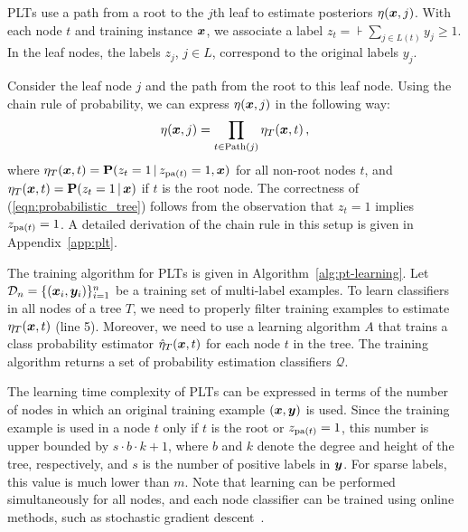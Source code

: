 \documentclass{article}
\newcommand{\cD}{\mathcal{D}}
\newcommand{\prob}{\mathbf{P}}
\newcommand{\Algo}[1]{\textsc{#1}}
\begin{document}
\Algo{PLT}s use a path from a root to the $j$\/th leaf to estimate posteriors $\eta(\boldsymbol{x}, j)$. %
With each node $t$ and training instance $\boldsymbol{x}$, we associate a label $z_t = \assert{\textstyle \sum_{j \in L(t)} y_j \ge 1}$.
In the leaf nodes, the labels $z_j$, $j \in L$, correspond to the original labels $y_j$.

Consider the leaf node $j$ and the path from the root to this leaf node. Using the chain rule of probability, we can express $\eta(\boldsymbol{x}, j)$ in the following way:
\begin{equation}
\eta(\boldsymbol{x}, j) = \prod_{t \in \mathrm{Path}(j)} \eta_T(\boldsymbol{x}, t)\,,
\label{eqn:probabilistic_tree}
\end{equation}
where $\eta_T(\bx, t) = \prob(z_t = 1 \given z_{\pa{t}} =1, \bx)$ for all non-root nodes $t$, and $\eta_T(\bx, t) = \prob(z_t = 1 \given \bx)$ if $t$ is the root node. 
The correctness of (\ref{eqn:probabilistic_tree}) follows from the observation that $z_{t} = 1$ implies $z_{\mathrm{pa}(t)} = 1$. A detailed derivation of the chain rule in this setup is given in Appendix~\ref{app:plt}.


The training algorithm for \Algo{PLT}s is given in Algorithm~\ref{alg:pt-learning}.
Let $\cD_n = \{ (\bx_i, \by_{i}) \}_{i=1}^n$ be a training set of multi-label examples.
To learn classifiers in all nodes of a tree $T$, we need to properly filter training examples to estimate $\eta_T(\boldsymbol{x},t)$ (line 5). Moreover, we need to use a learning algorithm $A$ that trains a class probability estimator $\hat{\eta}_T(\boldsymbol{x},t)$ for each node $t$ in the tree. %
The training algorithm returns a set of probability estimation classifiers $\mathcal{Q}$.

The learning time complexity of \Algo{PLT}s can be expressed in terms of the number of nodes in which an original training example $(\boldsymbol{x},\boldsymbol{y})$ is used. Since the training example is used in a node $t$ only if $t$ is the root or $z_{\mathrm{pa}(t)} = 1$, this number is upper bounded by $s\cdot b \cdot k+1$, where $b$ and $k$ denote the degree and height of the tree, respectively, and $s$ is the number of positive labels in $\boldsymbol{y}$. For sparse labels, this value is much lower than $m$. Note that learning can be performed simultaneously for all nodes, and each node classifier can be trained using online methods, such as stochastic gradient descent~\cite{Bottou_2010}.
\end{document}

